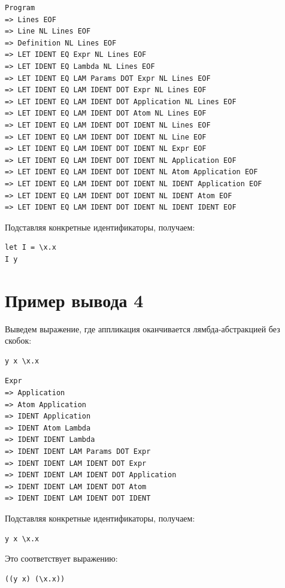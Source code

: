 \documentclass[12pt,a4paper]{article}
\begin{document}
\begin{verbatim}
Program
=> Lines EOF
=> Line NL Lines EOF
=> Definition NL Lines EOF
=> LET IDENT EQ Expr NL Lines EOF
=> LET IDENT EQ Lambda NL Lines EOF
=> LET IDENT EQ LAM Params DOT Expr NL Lines EOF
=> LET IDENT EQ LAM IDENT DOT Expr NL Lines EOF
=> LET IDENT EQ LAM IDENT DOT Application NL Lines EOF
=> LET IDENT EQ LAM IDENT DOT Atom NL Lines EOF
=> LET IDENT EQ LAM IDENT DOT IDENT NL Lines EOF
=> LET IDENT EQ LAM IDENT DOT IDENT NL Line EOF
=> LET IDENT EQ LAM IDENT DOT IDENT NL Expr EOF
=> LET IDENT EQ LAM IDENT DOT IDENT NL Application EOF
=> LET IDENT EQ LAM IDENT DOT IDENT NL Atom Application EOF
=> LET IDENT EQ LAM IDENT DOT IDENT NL IDENT Application EOF
=> LET IDENT EQ LAM IDENT DOT IDENT NL IDENT Atom EOF
=> LET IDENT EQ LAM IDENT DOT IDENT NL IDENT IDENT EOF
\end{verbatim}

Подставляя конкретные идентификаторы, получаем:

\begin{verbatim}
let I = \x.x
I y
\end{verbatim}

\section*{Пример вывода 4}

Выведем выражение, где аппликация оканчивается лямбда-абстракцией без скобок:

\begin{verbatim}
y x \x.x
\end{verbatim}

\begin{verbatim}
Expr
=> Application
=> Atom Application
=> IDENT Application
=> IDENT Atom Lambda
=> IDENT IDENT Lambda
=> IDENT IDENT LAM Params DOT Expr
=> IDENT IDENT LAM IDENT DOT Expr
=> IDENT IDENT LAM IDENT DOT Application
=> IDENT IDENT LAM IDENT DOT Atom
=> IDENT IDENT LAM IDENT DOT IDENT
\end{verbatim}

Подставляя конкретные идентификаторы, получаем:

\begin{verbatim}
y x \x.x
\end{verbatim}

Это соответствует выражению:

\begin{verbatim}
((y x) (\x.x))
\end{verbatim}
\end{document}
